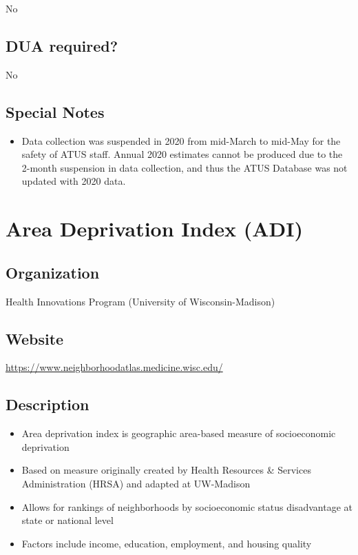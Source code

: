 \documentclass[
]{book}
\providecommand{\tightlist}{%
  \setlength{\itemsep}{0pt}\setlength{\parskip}{0pt}}
\begin{document}
No

\hypertarget{dua-required-7}{%
\section{DUA required?}\label{dua-required-7}}

No

\hypertarget{special-notes-7}{%
\section{Special Notes}\label{special-notes-7}}

\begin{itemize}
\tightlist
\item
  Data collection was suspended in 2020 from mid-March to mid-May for the safety of ATUS staff. Annual 2020 estimates cannot be produced due to the 2-month suspension in data collection, and thus the ATUS Database was not updated with 2020 data.
\end{itemize}

\mainmatter

\hypertarget{area-deprivation-index-adi}{%
\chapter{Area Deprivation Index (ADI)}\label{area-deprivation-index-adi}}

\hypertarget{organization-8}{%
\section{Organization}\label{organization-8}}

Health Innovations Program (University of Wisconsin-Madison)

\hypertarget{website-8}{%
\section{Website}\label{website-8}}

\url{https://www.neighborhoodatlas.medicine.wisc.edu/}

\hypertarget{description-8}{%
\section{Description}\label{description-8}}

\begin{itemize}
\tightlist
\item
  Area deprivation index is geographic area-based measure of socioeconomic deprivation
\item
  Based on measure originally created by Health Resources \& Services Administration (HRSA) and adapted at UW-Madison
\item
  Allows for rankings of neighborhoods by socioeconomic status disadvantage at state or national level
\item
  Factors include income, education, employment, and housing quality
\end{itemize}
\end{document}
